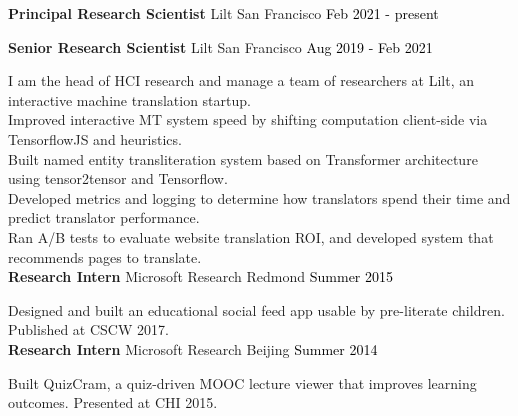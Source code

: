 \documentclass[10pt,A4]{article}
\newcommand{\cvevtzero}[4]
{

	\textbf{#2} \hspace{1mm} \textcolor{bgcol}{#3} \hfill \vspace{2.5pt}\textcolor{black}{#1}

\vspace{-8pt}
\vspace{6pt}

}
\newcommand{\cvevtzeronohrule}[4]
{

  \textbf{#2} \hspace{1mm} \textcolor{bgcol}{#3} \hfill \vspace{2.5pt}\textcolor{black}{#1}

\vspace{-8pt}
\vspace{6pt}

}
\newcommand{\cvevtone}[4]
{

	\textbf{#2} \hspace{1mm} \textcolor{bgcol}{#3} \hfill \vspace{2.5pt}\textcolor{black}{#1}

\vspace{-8pt}
\vspace{6pt}

  #4\\[3pt]

}
\begin{document}
\cvevtzeronohrule{Feb 2021 - present}{Principal Research Scientist}{\textcolor{sectcol}{Lilt} \hspace{1mm} San Francisco}\\
\cvevtzero{Aug 2019 - Feb 2021}{Senior Research Scientist}{\hspace{3.2mm} \textcolor{sectcol}{Lilt} \hspace{1mm} San Francisco}\\
I am the head of HCI research and manage a team of researchers at Lilt, an interactive machine translation startup.\\
Improved interactive MT system speed by shifting computation client-side via TensorflowJS and heuristics.\\
Built named entity transliteration system based on Transformer architecture using tensor2tensor and Tensorflow.\\
Developed metrics and logging to determine how translators spend their time and predict translator performance.\\
Ran A/B tests to evaluate website translation ROI, and developed system that recommends pages to translate. \\


%
\cvevtone{Summer 2015}{Research Intern}{\textcolor{sectcol}{Microsoft Research} \hspace{1mm} Redmond}{Designed and built an educational social feed app usable by pre-literate children. Published at CSCW 2017.} %

\cvevtone{Summer 2014}{Research Intern}{\textcolor{sectcol}{Microsoft Research} \hspace{1mm} Beijing}{Built QuizCram, a quiz-driven MOOC lecture viewer that improves learning outcomes. Presented at CHI 2015.} %
\end{document}
